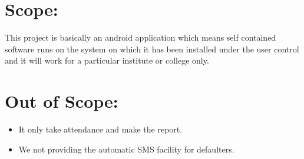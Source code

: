 \section{Scope: }
	This project is basically an android application which means self contained software runs on the system on which it has been installed under the user control and it will work for a particular institute or college only.

\section{Out of Scope: }	
\begin{itemize}
     \item         It only take attendance and make the report.
     \item         We not providing the automatic SMS facility for defaulters.
     \end{itemize}


